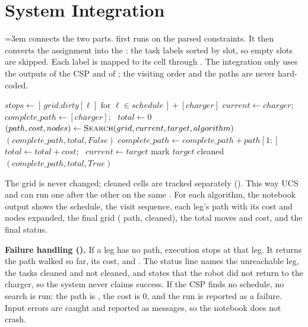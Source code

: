 \newpage
\section{System Integration}

{\emergencystretch=3em  connects the two parts.
 first runs  on the parsed constraints. It then
converts the assignment into the : the task labels sorted by slot, so empty slots are
skipped. Each label is mapped to its cell through . The integration only uses the
outputs of the CSP and of ; the visiting order and the paths are never hard-coded.\par}

\begin{algorithm}[!htbp]
\caption{Executing the CSP schedule with graph search}
\begin{algorithmic}[1]
  \State $stops \gets [\,grid.dirty[\ell] \text{ for } \ell \in schedule\,] + [charger]$
  \State $current \gets charger$; \ $complete\_path \gets [charger]$; \ $total \gets 0$
    \State $(path, cost, nodes) \gets \Call{Search}{grid, current, target, algorithm}$
      \State \Return $(complete\_path, total, \textit{False})$ 
    \EndIf
    \State $complete\_path \gets complete\_path + path[1{:}]$ 
    \State $total \gets total + cost$; \ $current \gets target$
     mark $target$ cleaned
    \EndIf
  \EndFor
  \State \Return $(complete\_path, total, \textit{True})$ 
\EndFunction
\end{algorithmic}
\end{algorithm}

The grid is never changed; cleaned cells are tracked separately (). This way UCS and
\astar{} can run one after the other on the same . For each algorithm, the notebook output
shows the schedule, the visit sequence, each leg's path with its cost and nodes expanded, the final
grid (\code{*} path,  cleaned), the total moves and cost, and the final status.

\textbf{Failure handling ().} If a leg has no path, execution stops at that leg. It returns
the path walked so far, its cost, and . The status line names the unreachable
leg, the tasks cleaned and not cleaned, and states that the robot did not return to the charger, so
the system never claims success. If the CSP finds no schedule, no search is run: the path is
\code{[charger]}, the cost is 0, and the run is reported as a failure. Input errors are caught and
reported as  messages, so the notebook does not crash.
